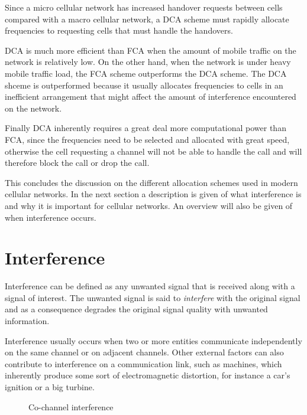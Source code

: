Since a micro cellular network has increased handover requests between cells compared with a macro cellular network, a DCA scheme must rapidly allocate frequencies to requesting cells that must handle the handovers\cite{PrinciplesMobileCommunication,WirelessCommunications,MobileWirelessCommunications}.

DCA is much more efficient than FCA when the amount of mobile traffic on the network is relatively low\cite{PrinciplesMobileCommunication,WirelessCommunications}. On the other hand, when the network is under heavy mobile traffic load, the FCA scheme outperforms the DCA scheme\cite{WirelessCommunications}. The DCA shceme is outperformed because it usually allocates frequencies to cells in an inefficient arrangement that might affect the amount of interference encountered on the network\cite{MobileWirelessCommunications}.

Finally DCA inherently requires a great deal more computational power than FCA, since the frequencies need to be selected and allocated with great speed, otherwise the cell requesting a channel will not be able to handle the call and will therefore block the call or drop the call\cite{PrinciplesMobileCommunication,WirelessCommunications,MobileWirelessCommunications}.


This concludes the discussion on the different allocation schemes used in modern cellular networks. In the next section a description is given of what interference is and why it is important for cellular networks. An overview will also be given of when interference occurs.

\section{Interference}
\label{sec:Interference}
Interference can be defined as any unwanted signal that is received along with a signal of interest. The unwanted signal is said to \emph{interfere} with the original signal and as a consequence degrades the original signal quality with unwanted information\cite{WirelessDigitalCommunications}.

Interference usually occurs when two or more entities communicate independently on the same channel or on adjacent channels\cite{WirelessCommunications,WirelessDigitalCommunications}. Other external factors can also contribute to interference on a communication link, such as machines, which inherently produce some sort of electromagnetic distortion, for instance a car's ignition or a big turbine\cite{WirelessCommunications,WirelessDigitalCommunications}. 
\begin{figure}[t!]
	\begin{centering}
	
	\label{fig:sameinterference}
	\caption{Co-channel interference}
	\end{centering}
\end{figure}


